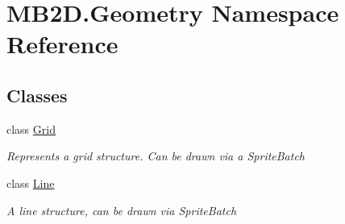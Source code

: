 \hypertarget{namespace_m_b2_d_1_1_geometry}{}\section{M\+B2\+D.\+Geometry Namespace Reference}
\label{namespace_m_b2_d_1_1_geometry}
\subsection*{Classes}
\begin{DoxyCompactItemize}
\item 
class \hyperlink{class_m_b2_d_1_1_geometry_1_1_grid}{Grid}
\begin{DoxyCompactList}\small\item\em Represents a grid structure. Can be drawn via a Sprite\+Batch \end{DoxyCompactList}\item 
class \hyperlink{class_m_b2_d_1_1_geometry_1_1_line}{Line}
\begin{DoxyCompactList}\small\item\em A line structure, can be drawn via Sprite\+Batch \end{DoxyCompactList}\end{DoxyCompactItemize}
